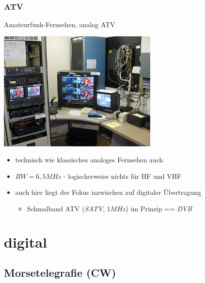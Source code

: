 \begin{frame}
    \frametitle{ATV}

    Amateurfunk-Fernsehen, analog ATV

    \begin{center}
        \includegraphics[width=0.6\textwidth]{e16/SVECS-atv16.jpg}
        \tiny \hyperlink{refs}{\cite{atv}}
    \end{center}

    \begin{itemize}
        \item technisch wie klassisches analoges Fernsehen auch
        \item $BW = 6,5 MHz$ - logischerweise nichts für HF und VHF
        \item auch hier liegt der Fokus inzwischen auf digitaler Übertragung
        \begin{itemize}
            \item Schmalband ATV (\emph{SATV}, $1 MHz$) im Prinzip == \emph{DVB}
        \end{itemize}
    \end{itemize}

\end{frame}

\section{digital}

\subsection[CW]{Morsetelegrafie (CW)}


